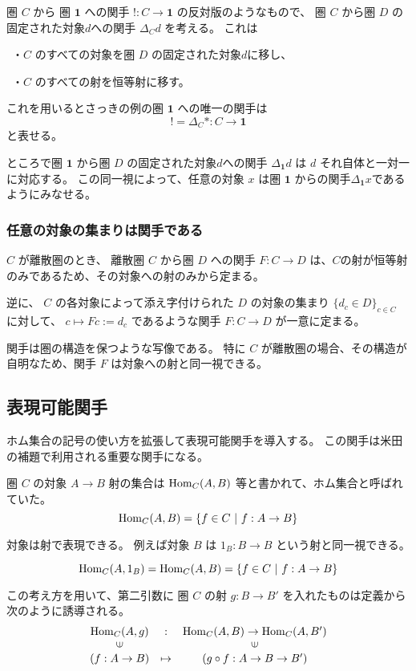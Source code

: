 \documentclass[uplatex,a4j,12pt,dvipdfmx]{jsarticle}
\begin{document}
圏 $C$ から 圏 $\textbf{1}$ への関手 $!: C \to \mathbf{1}$ の反対版のようなもので、
圏 $C$ から圏 $D$ の固定された対象$d$への関手 $\Delta_{C} d$ を考える。
これは

\ ・$C$ のすべての対象を圏 $D$ の固定された対象$d$に移し、

\ ・$C$ のすべての射を恒等射に移す。

これを用いるとさっきの例の圏 $\textbf{1}$ への唯一の関手は
\[
	! = \Delta_{C} * : C \to \mathbf{1}
\]
と表せる。

ところで圏 $\textbf{1}$ から圏 $D$ の固定された対象$d$への関手 $\Delta_{\textbf{1}} d$ は $d$ それ自体と一対一に対応する。
この同一視によって、任意の対象 $x$ は圏 $\textbf{1}$ からの関手$\Delta_{\textbf{1}} x$であるようにみなせる。


\subsubsection{任意の対象の集まりは関手である}

$C$ が離散圏のとき、 離散圏 $C$ から圏 $D$ への関手
$F: C \to D$ は、$C$の射が恒等射のみであるため、その対象への射のみから定まる。

逆に、 $C$ の各対象によって添え字付けられた $D$ の対象の集まり
$\{ d_{c} \in D \}_{c \in C}$ に対して、
$c \mapsto Fc := d_{c}$ であるような関手 $F: C \to D$ が一意に定まる。

関手は圏の構造を保つような写像である。
特に $C$ が離散圏の場合、その構造が自明なため、関手 $F$ は対象への射と同一視できる。

\subsection{表現可能関手}

ホム集合の記号の使い方を拡張して表現可能関手を導入する。
この関手は米田の補題で利用される重要な関手になる。

圏 $C$ の対象 $A \to B$ 射の集合は ${\rm Hom}_{C}(A,B)$ 等と書かれて、ホム集合と呼ばれていた。
$${\rm Hom}_{C}(A,B) = \{ f \in C \ | \ f : A \to B\}$$

対象は射で表現できる。
例えば対象 $B$ は $1_{B}: B \to B$ という射と同一視できる。

\[
	{\rm Hom}_{C}(A,1_{B}) = {\rm Hom}_{C}(A,B) = \{ f \in C \ | \ f : A \to B\}
\]

この考え方を用いて、第二引数に
圏 $C$ の射
$g : B \to B'$
を入れたものは定義から次のように誘導される。
\[
	\begin{array}{ccc}
		{\rm Hom}_{C}(A,g)      & :       & {\rm Hom}_{C}(A,B) \to {\rm Hom}_{C}(A,B') \\
		\rotatebox{90}{${\in}$} &         & \rotatebox{90}{${\in}$}                    \\
		(f : A \to B)           & \mapsto & (g \circ f : A \to B \to B')
	\end{array}
\]
\end{document}
